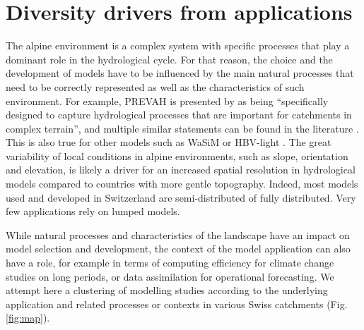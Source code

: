 \documentclass[10pt,a4paper]{article}
\begin{document}
\section{Diversity drivers from applications}
\label{sec:application}

The alpine environment is a complex system with specific processes that play a dominant role in the hydrological cycle. For that reason, the choice and the development of models have to be influenced by the main natural processes that need to be correctly represented as well as the characteristics of such environment. For example, PREVAH is presented by \citet{Anghileri2019} as being “specifically designed to capture hydrological processes that are important for catchments in complex terrain”, and multiple similar statements can be found in the literature \citep{Verbunt2007, Zappa2007, Koplin2010,  Brunner2019e}. This is also true for other models such as WaSiM \citep{Jasper2002, Jasper2003, Thornton2021} or HBV-light \citep{Sikorska-Senoner2020}. The great variability of local conditions in alpine environments, such as slope, orientation and elevation, is likely a driver for an increased spatial resolution in hydrological models compared to countries with more gentle topography. Indeed, most models used and developed in Switzerland are semi-distributed of fully distributed. Very few applications rely on lumped models.

While natural processes and characteristics of the landscape have an impact on model selection and development, the context of the model application can also have a role, for example in terms of computing efficiency for climate change studies on long periods, or data assimilation for operational forecasting. We attempt here a clustering of modelling studies according to the underlying application and related processes or contexts in various Swiss catchments (Fig. \ref{fig:map}).
\end{document}
